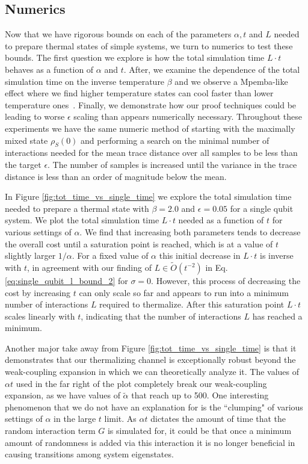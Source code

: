\documentclass[
 amsmath,amssymb,
 aps,
onecolumn, 
nofootinbib]{revtex4-2}
\newcommand{\bigotilde}[1]{\widetilde{O} \left( #1 \right)}
\begin{document}
\subsection{Numerics} \label{sec:specific_numerics}
Now that we have rigorous bounds on each of the parameters $\alpha, t$ and $L$ needed to prepare thermal states of simple systems, we turn to numerics to test these bounds. The first question we explore is how the total simulation time $L \cdot t$ behaves as a function of $\alpha$ and $t$. After, we examine the dependence of the total simulation time on the inverse temperature $\beta$ and we observe a Mpemba-like effect where we find higher temperature states can cool faster than lower temperature ones~\cite{auerbach1995supercooling}. Finally, we demonstrate how our proof techniques could be leading to worse $\epsilon$ scaling than appears numerically necessary. Throughout these experiments we have the same numeric method of starting with the maximally mixed state $\rho_S(0)$ and performing a search on the minimal number of interactions needed for the mean trace distance over all samples to be less than the target $\epsilon$. The number of samples is increased until the variance in the trace distance is less than an order of magnitude below the mean.

In Figure \ref{fig:tot_time_vs_single_time} we explore the total simulation time needed to prepare a thermal state with $\beta = 2.0$ and $\epsilon = 0.05$ for a single qubit system. We plot the total simulation time $L \cdot t$ needed as a function of $t$ for various settings of $\alpha$. We find that increasing both parameters tends to decrease the overall cost until a saturation point is reached, which is at a value of $t$ slightly larger $1/\alpha$. For a fixed value of $\alpha$ this initial decrease in $L \cdot t$ is inverse with $t$, in agreement with our finding of $L \in \bigotilde{t^{-2}}$ in Eq. \eqref{eq:single_qubit_l_bound_2} for $\sigma = 0$. However, this process of decreasing the cost by increasing $t$ can only scale so far and appears to run into a minimum number of interactions $L$ required to thermalize. After this saturation point $L \cdot t$ scales linearly with $t$, indicating that the number of interactions $L$ has reached a minimum. 

Another major take away from Figure \ref{fig:tot_time_vs_single_time} is that it demonstrates that our thermalizing channel is exceptionally robust beyond the weak-coupling expansion in which we can theoretically analyze it. The values of $\alpha t$ used in the far right of the plot completely break our weak-coupling expansion, as we have values of $\widetilde{\alpha}$ that reach up to 500. One interesting phenomenon that we do not have an explanation for is the ``clumping" of various settings of $\alpha$ in the large $t$ limit. As $\alpha t$ dictates the amount of time that the random interaction term $G$ is simulated for, it could be that once a minimum amount of randomness is added via this interaction it is no longer beneficial in causing transitions among system eigenstates. 
\end{document}
